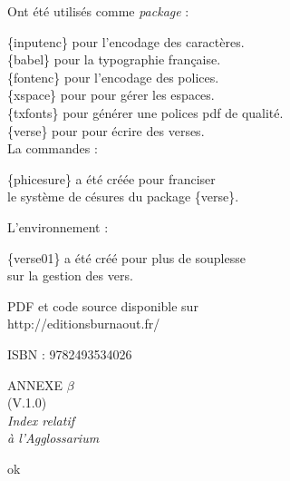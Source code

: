 \documentclass[1pt, onecolumn, oneside, a4paper] {book}
\begin{document}
\medbreak
\medbreak
Ont été utilisés comme \textit{package} :

\{inputenc\} pour l'encodage des caractères.\\
 \{babel\} pour la  typographie française.\\
\{fontenc\} pour l'encodage des polices.\\
\{xspace\} pour pour gérer les espaces.\\
\{txfonts\} pour générer une polices pdf de qualité.\\
\{verse\} pour pour écrire des verses.\\

\medbreak\medbreak
La commandes : 

\{phicesure\} a été créée pour franciser\\  le système de césures du package \{verse\}.

\medbreak\medbreak
L'environnement  : 

\{verse01\} a été créé pour plus de souplesse\\ sur la gestion des vers.

\medbreak\medbreak
PDF et code source disponible sur \\ 
http://editionsburnaout.fr/

\medbreak\medbreak
ISBN : 9782493534026


\newpage

\begin{center}

\thispagestyle{empty}
{\fontsize{30}{48}\selectfont ANNEXE $\beta$ \\ 
\vspace{8mm}
\Large (V.1.0)\\ 
\vspace{5mm}
\Huge{}\selectfont
{\textit{Index relatif\\ à l'Agglossarium}}}\\
\vspace{15cm}
\vspace{\fill}
\end{center}
\newpage
ok
\end{document}
